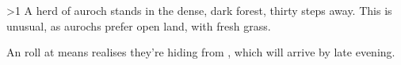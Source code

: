 \ifnum\value{temperature}>1
\else
\fi
A herd of auroch stands in the dense, dark forest, thirty \glspl{step} away.
This is unusual, as aurochs prefer open land, with fresh grass.

An  roll at \tn[10] means  realises they're hiding from , which will arrive by late evening.

\auroch
